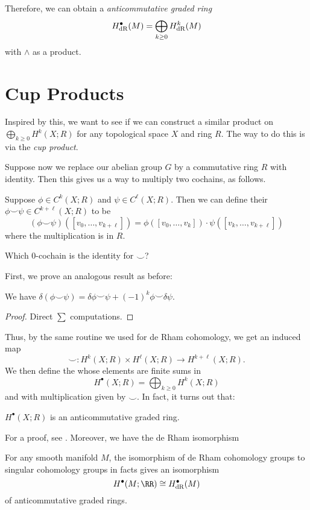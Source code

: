 Therefore, we can obtain a \emph{anticommutative graded ring}
\[ H_{\mathrm{dR}}^\bullet(M) = \bigoplus_{k \ge 0} H_{\mathrm{dR}}^k(M) \]
with $\wedge$ as a product.

\section{Cup Products}
Inspired by this, we want to see if we can construct a similar product
on $\bigoplus_{k \ge 0} H^k(X; R)$ for any topological space $X$ and ring $R$.
The way to do this is via the \emph{cup product}.

Suppose now we replace our abelian group $G$ by a commutative ring $R$ with identity.
Then this gives us a way to multiply two cochains, as follows.
\begin{definition}
	Suppose $\phi \in C^k(X;R)$ and $\psi \in C^\ell(X;R)$.
	Then we can define their 
	$\phi\smile\psi \in C^{k+\ell}(X;R)$ to be
	\[
		(\phi\smile\psi)([v_0, \dots, v_{k+\ell}])
		= 
		\phi\left( [v_0, \dots, v_k] \right)
		\cdot
		\psi\left( [v_k, \dots, v_{k+\ell}] \right)
	\]
	where the multiplication is in $R$.
\end{definition}

\begin{ques}
	Which $0$-cochain is the identity for $\smile$?
\end{ques}

First, we prove an analogous result as before:
\begin{lemma}
	We have
	$\delta(\phi\smile\psi) = \delta\phi\smile\psi
	+ (-1)^k\phi\smile\delta\psi$.
\end{lemma}
\begin{proof}
	Direct $\sum$ computations.
\end{proof}
Thus, by the same routine we used for de Rham cohomology, we get
an induced map
\[ \smile : H^k(X;R) \times H^\ell(X;R) \to H^{k+\ell}(X;R).  \]
We then define the  
whose elements are finite sums in 
\[ H^\bullet(X;R) = \bigoplus_{k \ge 0} H^k(X;R) \]
and with multiplication given by $\smile$.
In fact, it turns out that:
\begin{proposition}
	$H^\bullet(X; R)$ is an anticommutative graded ring.
\end{proposition}
For a proof, see \cite[Theorem 3.11, pages 210-212]{ref:hatcher}.
Moreover, we have the de Rham isomorphism
\begin{theorem}
	For any smooth manifold $M$, the isomorphism
	of de Rham cohomology groups to singular cohomology
	groups in facts gives an isomorphism
	\[ H^\bullet(M; \RR) \cong \HdR^\bullet(M) \]
	of anticommutative graded rings.
\end{theorem}

